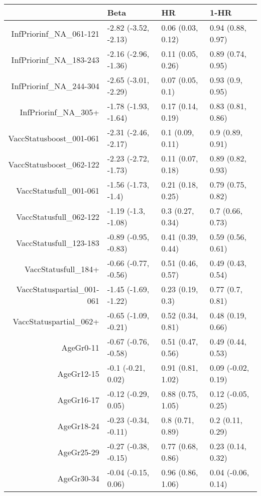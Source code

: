 \begin{table}[ht]
\centering
\begin{tabular}{rlll}
  \hline
 & Beta & HR & 1-HR \\ 
  \hline
InfPriorinf\_NA\_061-121 & -2.82 (-3.52, -2.13) & 0.06 (0.03, 0.12) & 0.94 (0.88, 0.97) \\ 
  InfPriorinf\_NA\_183-243 & -2.16 (-2.96, -1.36) & 0.11 (0.05, 0.26) & 0.89 (0.74, 0.95) \\ 
  InfPriorinf\_NA\_244-304 & -2.65 (-3.01, -2.29) & 0.07 (0.05, 0.1) & 0.93 (0.9, 0.95) \\ 
  InfPriorinf\_NA\_305+ & -1.78 (-1.93, -1.64) & 0.17 (0.14, 0.19) & 0.83 (0.81, 0.86) \\ 
  VaccStatusboost\_001-061 & -2.31 (-2.46, -2.17) & 0.1 (0.09, 0.11) & 0.9 (0.89, 0.91) \\ 
  VaccStatusboost\_062-122 & -2.23 (-2.72, -1.73) & 0.11 (0.07, 0.18) & 0.89 (0.82, 0.93) \\ 
  VaccStatusfull\_001-061 & -1.56 (-1.73, -1.4) & 0.21 (0.18, 0.25) & 0.79 (0.75, 0.82) \\ 
  VaccStatusfull\_062-122 & -1.19 (-1.3, -1.08) & 0.3 (0.27, 0.34) & 0.7 (0.66, 0.73) \\ 
  VaccStatusfull\_123-183 & -0.89 (-0.95, -0.83) & 0.41 (0.39, 0.44) & 0.59 (0.56, 0.61) \\ 
  VaccStatusfull\_184+ & -0.66 (-0.77, -0.56) & 0.51 (0.46, 0.57) & 0.49 (0.43, 0.54) \\ 
  VaccStatuspartial\_001-061 & -1.45 (-1.69, -1.22) & 0.23 (0.19, 0.3) & 0.77 (0.7, 0.81) \\ 
  VaccStatuspartial\_062+ & -0.65 (-1.09, -0.21) & 0.52 (0.34, 0.81) & 0.48 (0.19, 0.66) \\ 
  AgeGr0-11 & -0.67 (-0.76, -0.58) & 0.51 (0.47, 0.56) & 0.49 (0.44, 0.53) \\ 
  AgeGr12-15 & -0.1 (-0.21, 0.02) & 0.91 (0.81, 1.02) & 0.09 (-0.02, 0.19) \\ 
  AgeGr16-17 & -0.12 (-0.29, 0.05) & 0.88 (0.75, 1.05) & 0.12 (-0.05, 0.25) \\ 
  AgeGr18-24 & -0.23 (-0.34, -0.11) & 0.8 (0.71, 0.89) & 0.2 (0.11, 0.29) \\ 
  AgeGr25-29 & -0.27 (-0.38, -0.15) & 0.77 (0.68, 0.86) & 0.23 (0.14, 0.32) \\ 
  AgeGr30-34 & -0.04 (-0.15, 0.06) & 0.96 (0.86, 1.06) & 0.04 (-0.06, 0.14) \\ 

\end{tabular}
\end{table}
